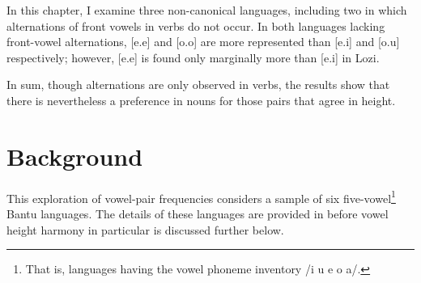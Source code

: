 \documentclass[output=paper]{langscibook}
\begin{document}
In this chapter, I examine three non-canonical languages, including two in which alternations of front vowels in verbs do not occur. In both languages lacking front-vowel alternations, [e.e] and [o.o] are more represented than [e.i] and [o.u] respectively; however, [e.e] is found only marginally more than [e.i] in Lozi.

In sum, though alternations are only observed in verbs, the results show that there is nevertheless a preference in nouns for those pairs that agree in height.

\section{Background}\label{sec:nichols:background}

This exploration of vowel-pair frequencies considers a sample of six five-vowel\footnote{That is, languages having the vowel phoneme inventory /i u e o a/.} Bantu languages. The details of these languages are provided in  before vowel height harmony in particular is discussed further below.

\begin{table}
\caption{The six-language sample of five-vowel Bantu languages\label{tab:nichols:sample}}
\end{table}
\end{document}
